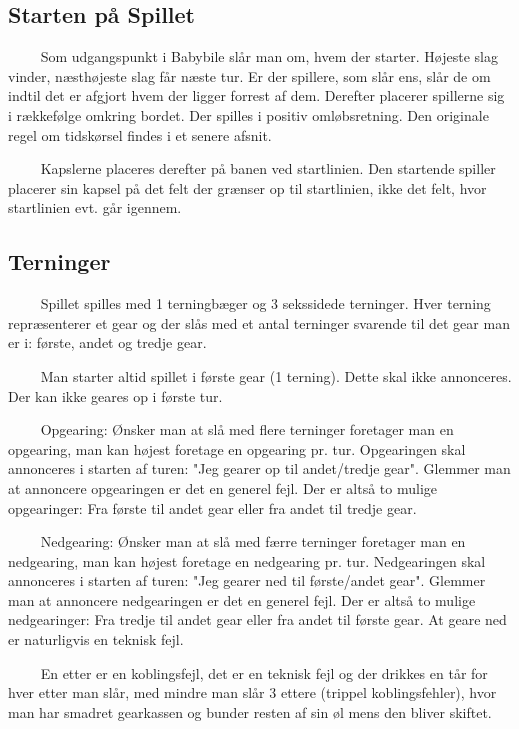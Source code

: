 \documentclass[12pt]{article}
\begin{document}
\subsection*{Starten på Spillet}

$\qquad$ Som udgangspunkt i Babybile slår man om, hvem der starter. Højeste slag vinder, næsthøjeste slag får næste tur. Er der spillere, som slår ens, slår de om indtil det er afgjort hvem der ligger forrest af dem. Derefter placerer spillerne sig i rækkefølge omkring bordet. Der spilles i positiv omløbsretning. Den originale regel om tidskørsel findes i et senere afsnit.

$\qquad$ Kapslerne placeres derefter på banen ved startlinien. Den startende spiller placerer sin kapsel på det felt der grænser op til startlinien, ikke det felt, hvor startlinien evt. går igennem.


\subsection*{Terninger}

$\qquad$ Spillet spilles med 1 terningbæger og 3 sekssidede terninger. Hver terning repræsenterer et gear og der slås med et antal terninger svarende til det gear man er i: første, andet og tredje gear.

$\qquad$ Man starter altid spillet i første gear (1 terning). Dette skal ikke annonceres. Der kan ikke geares op i første tur.

$\qquad$ Opgearing: Ønsker man at slå med flere terninger foretager man en opgearing, man kan højest foretage en opgearing pr. tur. Opgearingen skal annonceres i starten af turen: "Jeg gearer op til andet/tredje gear". Glemmer man at annoncere opgearingen er det en generel fejl. Der er altså to mulige opgearinger: Fra første til andet gear eller fra andet til tredje gear.

$\qquad$ Nedgearing: Ønsker man at slå med færre terninger foretager man en nedgearing, man kan højest foretage en nedgearing pr. tur. Nedgearingen skal annonceres i starten af turen: "Jeg gearer ned til første/andet gear". Glemmer man at annoncere nedgearingen er det en generel fejl. Der er altså to mulige nedgearinger: Fra tredje til andet gear eller fra andet til første gear. At geare ned er naturligvis en teknisk fejl.

$\qquad$ En etter er en koblingsfejl, det er en teknisk fejl og der drikkes en tår for hver etter man slår, med mindre man slår 3 ettere (trippel koblingsfehler), hvor man har smadret gearkassen og bunder resten af sin øl mens den bliver skiftet.
\end{document}
